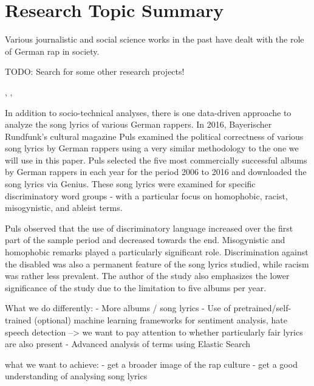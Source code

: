 \section{Research Topic Summary}\label{sec:research}

Various journalistic and social science works in the past have dealt with the role of German rap in society.

TODO: Search for some other research projects!

\cite{heinisch2018schlampe},
\cite{ahlers_2019},
\cite{wiegel2011deutscher}

In addition to socio-technical analyses, there is one data-driven approache to analyze the song lyrics of various German rappers. In 2016, Bayerischer Rundfunk's cultural magazine Puls \cite{puls_2016} examined the political correctness of various song lyrics by German rappers using a very similar methodology to the one we will use in this paper. Puls selected the five most commercially successful albums by German rappers in each year for the period 2006 to 2016 and downloaded the song lyrics via Genius. These song lyrics were examined for specific discriminatory word groups - with a particular focus on homophobic, racist, misogynistic, and ableist terms.

Puls observed that the use of discriminatory language increased over the first part of the sample period and decreased towards the end. Misogynistic and homophobic remarks played a particularly significant role. Discrimination against the disabled was also a permanent feature of the song lyrics studied, while racism was rather less prevalent. The author of the study also emphasizes the lower significance of the study due to the limitation to five albums per year.

What we do differently:
- More albums / song lyrics
- Use of pretrained/self-trained (optional) machine learning frameworks for sentiment analysis, hate speech detection --> we want to pay attention to whether particularly fair lyrics are also present
- Advanced analysis of terms using Elastic Search

what we want to achieve: 
- get a broader image of the rap culture
- get a good understanding of analysing song lyrics

